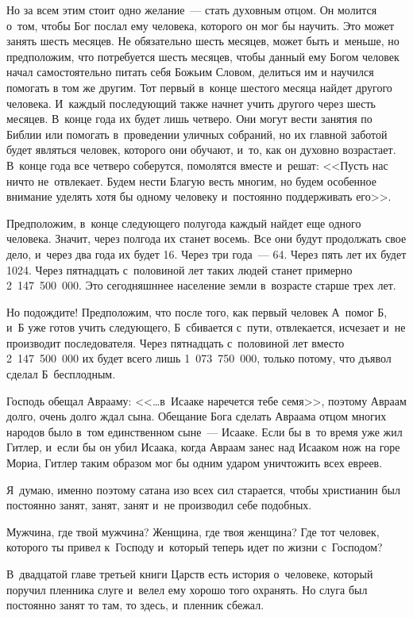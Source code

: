 \documentclass[12pt,article,a4paper,fittopage]{ncc}
\begin{document}
\begin{multicols}{2}
Но за всем этим стоит одно желание~--- стать духовным отцом. Он молится о~том, чтобы Бог послал ему человека, которого он мог бы научить. Это может занять шесть месяцев. Не обязательно шесть месяцев, может быть и~меньше, но предположим, что потребуется шесть месяцев, чтобы данный ему Богом человек начал самостоятельно питать себя Божьим Словом, делиться им и научился помогать в том же другим. Тот первый в~конце шестого месяца найдет другого человека. И~каждый последующий также начнет учить другого через шесть месяцев. В~конце года их будет лишь четверо. Они могут вести занятия по Библии или помогать в~проведении уличных собраний, но их главной заботой будет являться человек, которого они обучают, и~то, как он духовно возрастает. В~конце года все четверо соберутся, помолятся вместе и~решат: <<Пусть нас ничто не~отвлекает. Будем нести Благую весть многим, но будем особенное внимание уделять хотя бы одному человеку и~постоянно поддерживать его>>.

Предположим, в~конце следующего полугода каждый найдет еще одного человека. Значит, через полгода их станет восемь. Все они будут продолжать свое дело, и~через два года их будет 16. Через три года~--- 64. Через пять лет их будет 1024. Через пятнадцать с~половиной лет таких людей станет примерно 2~147~500~000. Это сегодняшннее население земли в~возрасте старше трех лет.

Но подождите! Предположим, что после того, как первый человек А~помог Б, и~Б уже готов учить следующего, Б~сбивается с~пути, отвлекается, исчезает и~не производит последователя. Через пятнадцать с~половиной лет вместо 2~147~500~000 их будет всего лишь 1~073~750~000, только потому, что дъявол сделал Б~бесплодным.

Господь обещал Аврааму: <<\ldots в~Исааке наречется тебе семя>>, поэтому Авраам долго, очень долго ждал сына. Обещание Бога сделать Авраама отцом многих народов было в~том единственном сыне~--- Исааке. Если бы в~то время уже жил Гитлер, и~если бы он убил Исаака, когда Авраам занес над Исааком нож на горе Мориа, Гитлер таким образом мог бы одним ударом уничтожить всех евреев.

Я~думаю, именно поэтому сатана изо всех сил старается, чтобы христианин был постоянно занят, занят, занят и~не производил себе подобных.

Мужчина, где твой мужчина? Женщина, где твоя женщина? Где тот человек, которого ты привел к~Господу и~который теперь идет по жизни с~Господом?

В~двадцатой главе третьей книги Царств есть история о~человеке, который поручил пленника слуге и~велел ему хорошо того охранять. Но слуга был постоянно занят то там, то здесь, и~пленник сбежал.


\end{multicols}
\end{document}
